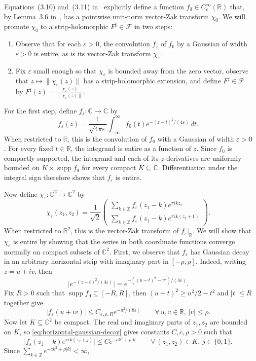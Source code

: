 \documentclass[10pt,a4paper]{amsart}
\newcommand{\R}{\mathbb{R}}
\newcommand{\C}{\mathbb{C}}
\newcommand{\Z}{\mathbb{Z}}
\begin{document}
Equations~(3.10) and~(3.11) in~\cite{FaulhuberPvC:26} explicitly define a function $f_0\in C_c^\infty(\R)$ that, by Lemma~3.6 in~\cite{FaulhuberPvC:26}, has a pointwise unit-norm vector-Zak transform
$\chi_0$.
We will promote $\chi_0$ to a strip-holomorphic $F^\sharp\in\mathcal{F}$ in two steps:
\begin{enumerate}
\item 
Observe that for each $\varepsilon>0$, the convolution $f_\varepsilon$
of $f_0$ by a Gaussian of width $\varepsilon>0$ is entire, as is its vector-Zak transform $\chi_\varepsilon$.
\item 
Fix $\varepsilon$ small enough so that $\chi_\varepsilon$ is bounded away from the zero vector, observe that $z\mapsto\|\chi_\varepsilon(z)\|$ has a strip-holomorphic extension, and define $F^\sharp\in\mathcal{F}$ by $F^\sharp(z)=\frac{\chi_\varepsilon(z)}{\|\chi_\varepsilon(z)\|}$.
\end{enumerate}

For the first step, 
define $f_\varepsilon\colon\mathbb{C}\to\mathbb{C}$ by 
\[
f_\varepsilon(z)
=
\frac{1}{\sqrt{4\pi\varepsilon}}
\int_{-\infty}^\infty
f_0(t)e^{-(z-t)^2/(4\varepsilon)}\,dt.
\]
When restricted to $\mathbb{R}$, this is the convolution of \(f_0\) with a Gaussian of width $\varepsilon>0$.
For every fixed \(t\in\R\), the integrand is entire as a function of \(z\).
Since \(f_0\) is compactly supported, the integrand and each of its
\(z\)-derivatives are uniformly bounded on
\(K\times\operatorname{supp}f_0\) for every compact \(K\subseteq\C\).
Differentiation under the integral sign therefore shows that
\(f_\varepsilon\) is entire.

Now define \(\chi_\varepsilon\colon\C^2\to\C^2\) by
\[
\chi_\varepsilon(z_1,z_2)
=
\frac{1}{\sqrt2}
\begin{pmatrix}
\displaystyle
\sum_{k\in\Z}f_\varepsilon(z_1-k)e^{\pi i k z_2}
\\[16pt]
\displaystyle
\sum_{k\in\Z}f_\varepsilon(z_1-k)e^{\pi i k(z_2+1)}
\end{pmatrix}.
\]
When restricted to $\R^2$, this is the vector-Zak transform of $f_\varepsilon|_\R$.
We will show that $\chi_\varepsilon$ is entire by showing that the series in both coordinate functions converge normally on compact subsets of \(\C^2\).
First, we observe that \(f_\varepsilon\) has Gaussian decay in an arbitrary horizontal strip with imaginary part in \([-\rho,\rho]\).
Indeed, writing \(z=u+iv\), then
\[
\big|e^{-(z-t)^2/(4\varepsilon)}\big|
=
e^{-((u-t)^2-v^2)/(4\varepsilon)}.
\]
Fix \(R>0\) such that \(\operatorname{supp}f_0\subseteq[-R,R]\), then
$
(u-t)^2\geq u^2/2-t^2
$
and \(|t|\leq R\) together give
\begin{equation}\label{eq:horizontal-gaussian-decay}
  |f_\varepsilon(u+iv)|
  \leq C_{\varepsilon,\rho,R}e^{-u^2/(8\varepsilon)}
  \qquad\forall\,u,v\in\R,\ |v|\leq \rho.
\end{equation}
Now let \(K\subseteq\C^2\) be compact.  The real and imaginary parts of
\(z_1,z_2\) are bounded on \(K\), so
\eqref{eq:horizontal-gaussian-decay} gives constants \(C,c,\rho>0\) such
that
\[
\big|
f_\varepsilon(z_1-k)e^{\pi i k(z_2+j)}
\big|
\leq
Ce^{-ck^2+\rho|k|}
\qquad
\forall\,(z_1,z_2)\in K,\ j\in\{0,1\}.
\]
Since
$
\sum_{k\in\Z}e^{-ck^2+\rho|k|}<\infty$,
\end{document}
